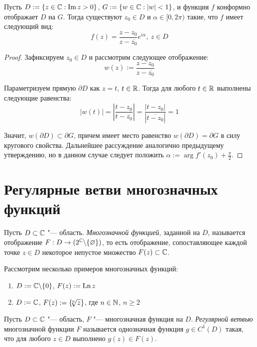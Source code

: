 \begin{proposition}
	Пусть $D := \{z \in \mathbb{C}: \operatorname{Im}{z} > 0\}$, $G := \{w \in \mathbb{C}: |w| < 1\}$, и функция $f$ конформно отображает $D$ на $G$. Тогда существуют $z_0 \in D$ и $\alpha \in [0, 2\pi)$ такие, что $f$ имеет следующий вид:
	\[f(z) = \frac{z - z_0}{z - \overline{z_0}}e^{i\alpha},~z \in D\]
\end{proposition}

\begin{proof}
	Зафиксируем $z_0 \in D$ и рассмотрим следующее отображение:
	\[w(z) := \frac{z - z_0}{z - \overline{z_0}}\]
	
	Параметризуем прямую $\partial D$ как $z = t$, $t \in \mathbb{R}$. Тогда для любого $t \in \mathbb{R}$ выполнены следующие равенства:
	\[\left|w\left(t\right)\right| = \left|\frac{t - z_0}{t - \overline{z_0}}\right| = \frac{|t - z_0|}{\left|\overline{t - z_0}\right|} =  1\]
	
	Значит, $w(\partial D) \subset \partial G$, причем имеет место равенство  $w(\partial D) = \partial G$ в силу кругового свойства. Дальнейшее рассуждение аналогично предыдущему утверждению, но в данном случае следует положить $\alpha := \arg{f'(z_0)} + \frac\pi 2$.
\end{proof}

\section{Регулярные ветви многозначных функций}

\begin{definition}
	Пусть $D \subset \mathbb{C}$ "--- область. \textit{Многозначной функцией}, заданной на $D$, называется отображение $F : D \to (2^{\mathbb{C}} \backslash \{\varnothing\})$, то есть отображение, сопоставляющее каждой точке $z \in D$ некоторое непустое множество $F(z) \subset \mathbb{C}$.
\end{definition}

\begin{example}
	Рассмотрим несколько примеров многозначных функций:
	\begin{enumerate}
		\item $D := \mathbb{C} \backslash \{0\}$, $F(z) := \operatorname{Ln}{z}$
		\item $D := \mathbb{C}$, $F(z) := \left\{\!\!\sqrt[n]{z}\right\}$, где $n \in \mathbb{N}$, $n \ge 2$
	\end{enumerate}
\end{example}

\begin{definition}
	Пусть $D \subset \mathbb{C}$ "--- область, $F$ "--- многозначная функция на $D$. \textit{Регулярной ветвью} многозначной функции $F$ называется однозначная функция $g \in C^1(D)$ такая, что для любого $z \in D$ выполнено $g(z) \in F(z)$.
\end{definition}


